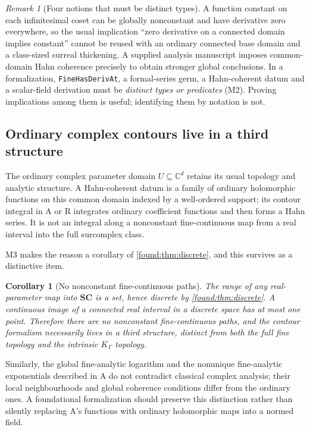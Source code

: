 \documentclass[11pt,letterpaper]{article}
\numberwithin{equation}{section}
\newtheorem{corollary}[theorem]{Corollary}
\theoremstyle{definition}
\theoremstyle{remark}
\newtheorem{remark}[theorem]{Remark}
\newcommand{\SC}{\mathbf{SC}}
\newcommand{\C}{\mathbb C}
\begin{document}
\begin{remark}[Four notions that must be distinct types]\label{found:rem:fourtypes}
A function constant on each infinitesimal coset can be globally nonconstant and
have derivative zero everywhere, so the usual implication ``zero derivative on a
connected domain implies constant'' cannot be reused with an ordinary connected
base domain and a class-sized surreal thickening. A supplied analysis
manuscript imposes common-domain Hahn coherence precisely to obtain stronger
global conclusions. In a formalization, \texttt{FineHasDerivAt}, a formal-series
germ, a Hahn-coherent datum and a scalar-field derivation must be \emph{distinct
types or predicates} (M2). Proving implications among them is useful;
identifying them by notation is not.
\end{remark}

\subsection{Ordinary complex contours live in a third structure}
\label{found:sub:contours}
The ordinary complex parameter domain $U\subseteq\C^d$ retains its usual
topology and analytic structure. A Hahn-coherent datum is a family of ordinary
holomorphic functions on this common domain indexed by a well-ordered support;
its contour integral in A or R integrates ordinary coefficient functions and
then forms a Hahn series. It is not an integral along a nonconstant
fine-continuous map from a real interval into the full surcomplex class.

M3 makes the reason a corollary of \cref{found:thm:discrete}, and this survives
as a distinctive item.

\begin{corollary}[No nonconstant fine-continuous paths]\label{found:cor:nopaths}
The range of any real-parameter map into $\SC$ is a set, hence discrete by
\cref{found:thm:discrete}. A continuous image of a connected real interval in a
discrete space has at most one point. Therefore there are no nonconstant
fine-continuous paths, and the contour formalism necessarily lives in a third
structure, distinct from both the full fine topology and the intrinsic
$K_\Gamma$ topology.
\end{corollary}

Similarly, the global fine-analytic logarithm and the nonunique fine-analytic
exponentials described in A do not contradict classical complex analysis; their
local neighbourhoods and global coherence conditions differ from the ordinary
ones. A foundational formalization should preserve this distinction rather than
silently replacing A's functions with ordinary holomorphic maps into a normed
field.
\end{document}
